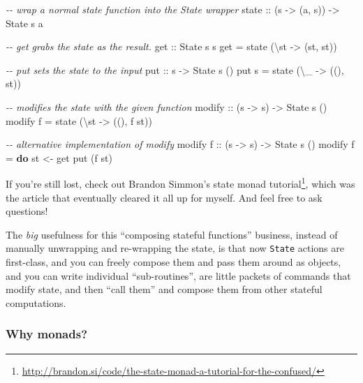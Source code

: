 \documentclass[]{article}
\newenvironment{Shaded}{}{}
\newcommand{\CommentTok}[1]{\textcolor[rgb]{0.38,0.63,0.69}{\textit{#1}}}
\newcommand{\DataTypeTok}[1]{\textcolor[rgb]{0.56,0.13,0.00}{#1}}
\newcommand{\KeywordTok}[1]{\textcolor[rgb]{0.00,0.44,0.13}{\textbf{#1}}}
\newcommand{\NormalTok}[1]{#1}
\newcommand{\OtherTok}[1]{\textcolor[rgb]{0.00,0.44,0.13}{#1}}
\renewcommand{\href}[2]{#2\footnote{\url{#1}}}
\begin{document}
\begin{Shaded}
\begin{Highlighting}[]
\CommentTok{{-}{-} wrap a normal state function into the State wrapper}
\OtherTok{state ::}\NormalTok{ (s }\OtherTok{{-}>}\NormalTok{ (a, s)) }\OtherTok{{-}>} \DataTypeTok{State}\NormalTok{ s a}

\CommentTok{{-}{-} get grabs the state as the result.}
\OtherTok{get ::} \DataTypeTok{State}\NormalTok{ s s}
\NormalTok{get }\OtherTok{=}\NormalTok{ state (\textbackslash{}st }\OtherTok{{-}>}\NormalTok{ (st, st))}

\CommentTok{{-}{-} put sets the state to the input}
\OtherTok{put ::}\NormalTok{ s }\OtherTok{{-}>} \DataTypeTok{State}\NormalTok{ s ()}
\NormalTok{put s }\OtherTok{=}\NormalTok{ state (\textbackslash{}\_ }\OtherTok{{-}>}\NormalTok{ ((), st))}

\CommentTok{{-}{-} modifies the state with the given function}
\OtherTok{modify ::}\NormalTok{ (s }\OtherTok{{-}>}\NormalTok{ s) }\OtherTok{{-}>} \DataTypeTok{State}\NormalTok{ s ()}
\NormalTok{modify f }\OtherTok{=}\NormalTok{ state (\textbackslash{}st }\OtherTok{{-}>}\NormalTok{ ((), f st))}

\CommentTok{{-}{-} alternative implementation of \textasciigrave{}modify\textasciigrave{}}
\NormalTok{modify\textquotesingle{}}\OtherTok{ f ::}\NormalTok{ (s }\OtherTok{{-}>}\NormalTok{ s) }\OtherTok{{-}>} \DataTypeTok{State}\NormalTok{ s ()}
\NormalTok{modify\textquotesingle{} f }\OtherTok{=} \KeywordTok{do}
\NormalTok{    st }\OtherTok{<{-}}\NormalTok{ get}
\NormalTok{    put (f st)}
\end{Highlighting}
\end{Shaded}

If you're still lost, check out Brandon Simmon's
\href{http://brandon.si/code/the-state-monad-a-tutorial-for-the-confused/}{state
monad tutorial}, which was the article that eventually cleared it all up for
myself. And feel free to ask questions!

The \emph{big} usefulness for this ``composing stateful functions'' business,
instead of manually unwrapping and re-wrapping the state, is that now
\texttt{State} actions are first-class, and you can freely compose them and pass
them around as objects, and you can write individual ``sub-routines'', are
little packets of commands that modify state, and then ``call them'' and compose
them from other stateful computations.

\hypertarget{why-monads}{%
\subsubsection{Why monads?}\label{why-monads}}
\end{document}
